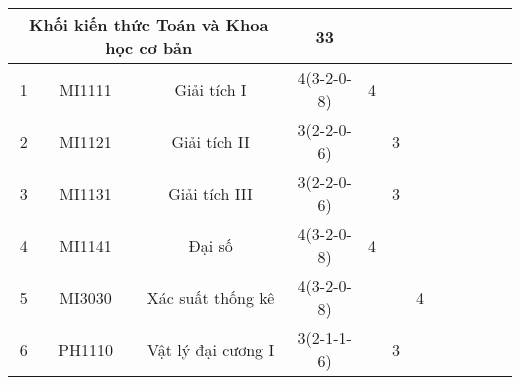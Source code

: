 \documentclass[12pt,a4paper]{report}
\begin{document}
\begin{landscape}
\begin{longtable}[c]{|c|c|c|c|c|c|c|c|c|c|c|c|}
        \multicolumn{3}{|c|}{\textbf{Khối kiến thức Toán và Khoa học cơ bản}}                                                          & \textbf{33}                                                                          &             &             &             &             &             &             &             &             \\ \hline
        1                             & MI1111                          & Giải tích I                                                  & 4(3-2-0-8)                                                                           & 4           &             &             &             &             &             &             &             \\ \hline
        2                             & MI1121                          & Giải tích II                                                 & 3(2-2-0-6)                                                                           &             & 3           &             &             &             &             &             &             \\ \hline
        3                             & MI1131                          & Giải tích III                                                & 3(2-2-0-6)                                                                           &             & 3           &             &             &             &             &             &             \\ \hline
        4                             & MI1141                          & Đại số                                                       & 4(3-2-0-8)                                                                           & 4           &             &             &             &             &             &             &             \\ \hline
        5                             & MI3030                          & Xác suất thống kê                                            & 4(3-2-0-8)                                                                           &             &             & 4           &             &             &             &             &             \\ \hline
        6                             & PH1110                          & Vật lý đại cương I                                           & 3(2-1-1-6)                                                                           &             & 3           &             &             &             &             &             &             \\ \hline

\end{longtable}
\end{landscape}
\end{document}
